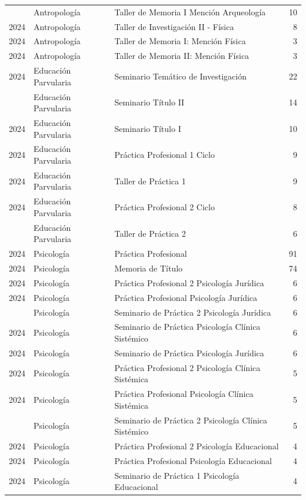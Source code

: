 \documentclass[
  spanish,
  a4paper,
  oneside]{scrbook}
\begin{document}
\begin{longtable}[t]{lllr}
\addlinespace
2024 & Antropología & Taller de Memoria I Mención Arqueología & 10\\
2024 & Antropología & Taller de Investigación II - Física & 8\\
2024 & Antropología & Taller de Memoria I: Mención Física & 3\\
2024 & Antropología & Taller de Memoria II: Mención Física & 3\\
2024 & Educación Parvularia & Seminario Temático de Investigación & 22\\
\addlinespace
2024 & Educación Parvularia & Seminario Título II & 14\\
2024 & Educación Parvularia & Seminario Título I & 10\\
2024 & Educación Parvularia & Práctica Profesional 1 Ciclo & 9\\
2024 & Educación Parvularia & Taller de Práctica 1 & 9\\
2024 & Educación Parvularia & Práctica Profesional 2 Ciclo & 8\\
\addlinespace
2024 & Educación Parvularia & Taller de Práctica 2 & 6\\
2024 & Psicología & Práctica Profesional & 91\\
2024 & Psicología & Memoria de Título & 74\\
2024 & Psicología & Práctica Profesional 2 Psicología Jurídica & 6\\
2024 & Psicología & Práctica Profesional Psicología Jurídica & 6\\
\addlinespace
2024 & Psicología & Seminario de Práctica 2 Psicología Jurídica & 6\\
2024 & Psicología & Seminario de Práctica Psicología Clínica Sistémico & 6\\
2024 & Psicología & Seminario de Práctica Psicología Jurídica & 6\\
2024 & Psicología & Práctica Profesional 2 Psicología Clínica Sistémica & 5\\
2024 & Psicología & Práctica Profesional Psicología Clínica Sistémica & 5\\
\addlinespace
2024 & Psicología & Seminario de Práctica 2 Psicología Clínica Sistémico & 5\\
2024 & Psicología & Práctica Profesional 2 Psicología Educacional & 4\\
2024 & Psicología & Práctica Profesional Psicología Educacional & 4\\
2024 & Psicología & Seminario de Práctica 1 Psicología Educacional & 4\\

\end{longtable}
\end{document}

